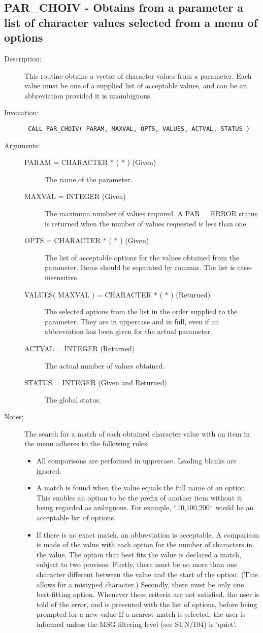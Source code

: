 \documentclass[twoside,11pt]{article}
\newcommand{\xref}[3]{#1}
\newcommand{\xlabel}[1]{}
\newcommand{\latex}[1]{#1}
\newlength{\sstbannerlength}
\newlength{\sstcaptionlength}
\newlength{\sstexampleslength}
\newlength{\sstexampleswidth}
\newcommand{\sstroutine}[3]{
   \goodbreak
   \rule{\textwidth}{0.5mm}
   \vspace{-7ex}
   \newline
   \settowidth{\sstbannerlength}{{\Large {\bf #1}}}
   \setlength{\sstcaptionlength}{\textwidth}
   \setlength{\sstexampleslength}{\textwidth}
   \addtolength{\sstbannerlength}{0.5em}
   \addtolength{\sstcaptionlength}{-2.0\sstbannerlength}
   \addtolength{\sstcaptionlength}{-5.0pt}
   \settowidth{\sstexampleswidth}{{\bf Examples:}}
   \addtolength{\sstexampleslength}{-\sstexampleswidth}
   \parbox[t]{\sstbannerlength}{\flushleft{\Large {\bf #1}}}
   \parbox[t]{\sstcaptionlength}{\center{\Large #2}}
   \parbox[t]{\sstbannerlength}{\flushright{\Large {\bf #1}}}
   \begin{description}
      #3
   \end{description}
}
\newcommand{\sstdescription}[1]{\item[Description:] #1}
\newcommand{\sstinvocation}[1]{\item[Invocation:]\hspace{0.4em}{\tt #1}}
\newcommand{\sstarguments}[1]{
   \item[Arguments:] \mbox{} \\
   \vspace{-3.5ex}
   \begin{description}
      #1
   \end{description}
}
\newcommand{\sstsubsection}[1]{ \item[{#1}] \mbox{} \\}
\newcommand{\sstnotes}[1]{\item[Notes:] \mbox{} \\[1.3ex] #1}
\newcommand{\ssttt}{\tt}
\renewcommand{\sstroutine}[3]{
      \subsection{\xlabel{12}#1\xlabel{#1}-\label{#1}#2}
      \begin{description}
         #3
      \end{description}
   }
\renewcommand{\sstdescription}[1]{\item[Description:]
      \begin{description}
         #1
      \end{description}
   }
\renewcommand{\sstinvocation}[1]{\item[Invocation:]
      \begin{description}
         {\ssttt #1}
      \end{description}
   }
\renewcommand{\sstarguments}[1]{
      \item[Arguments:]
      \begin{description}
         #1
      \end{description}
   }
\renewcommand{\sstsubsection}[1]{\item[{#1}]}
\renewcommand{\sstnotes}[1]{\item[Notes:]
      \begin{description}
         #1
      \end{description}
   }
\begin{document}
\sstroutine{
   PAR\_CHOIV
}{
   Obtains from a parameter a list of character values selected from
   a menu of options
}{
   \sstdescription{
      This routine obtains a vector of character values from a
      parameter.  Each value must be one of a supplied list of
      acceptable values, and can be an abbreviation provided it is
      unambiguous.
   }
   \sstinvocation{
      CALL PAR\_CHOIV( PARAM, MAXVAL, OPTS, VALUES, ACTVAL, STATUS )
   }
   \sstarguments{
      \sstsubsection{
         PARAM = CHARACTER $*$ ( $*$ ) (Given)
      }{
         The name of the parameter.
      }
      \sstsubsection{
         MAXVAL = INTEGER (Given)
      }{
         The maximum number of values required.  A PAR\_\_ERROR status is
         returned when the number of values requested is less than one.
      }
      \sstsubsection{
         OPTS = CHARACTER $*$ ( $*$ ) (Given)
      }{
         The list of acceptable options for the values obtained from the
         parameter.  Items should be separated by commas.  The list is
         case-insensitive.
      }
      \sstsubsection{
         VALUES( MAXVAL ) = CHARACTER $*$ ( $*$ ) (Returned)
      }{
         The selected options from the list in the order supplied to the
         parameter.  They are in uppercase and in full, even if an
         abbreviation has been given for the actual parameter.
      }
      \sstsubsection{
         ACTVAL = INTEGER (Returned)
      }{
         The actual number of values obtained.
      }
      \sstsubsection{
         STATUS = INTEGER (Given and Returned)
      }{
         The global status.
      }
   }
   \sstnotes{
      The search for a match of each obtained character value with an
      item in the menu adheres to the following rules.
      \begin{itemize}
      \item  All comparisons are performed in uppercase.  Leading blanks
         are ignored.
      \item  A match is found when the value equals the full name of an
         option.  This enables an option to be the prefix of another
         item without it being regarded as ambiguous.  For example,
         {\tt "}10,100,200{\tt "} would be an acceptable list of options.
         \item If there is no exact match, an abbreviation is acceptable.
         A comparison is made of the value with each option for the
         number of characters in the value.  The option that best fits
         the value is declared a match, subject to two provisos.
         Firstly, there must be no more than one character different
         between the value and the start of the option.  (This allows
         for a mistyped character.)  Secondly, there must be only one
         best-fitting option.  Whenever these criteria are not
         satisfied, the user is told of the error, and is presented
         with the list of options, before being prompted for a new value
         If a nearest match is selected, the user is informed unless the
\xref{MSG filtering level}{sun104}{conditional_message_reporting}
\latex{ (see SUN/104)} is `quiet'.
         \end{itemize}
   }
}
\end{document}
